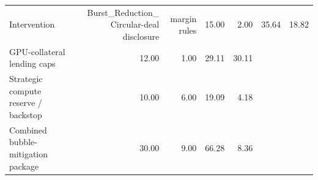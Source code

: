 \begin{tabular}{lrrrr}
\toprule
Intervention & Burst_Reduction_%
\midrule
Circular-deal disclosure & margin rules & 15.00 & 2.00 & 35.64 & 18.82 \\
GPU-collateral lending caps & 12.00 & 1.00 & 29.11 & 30.11 \\
Strategic compute reserve / backstop & 10.00 & 6.00 & 19.09 & 4.18 \\
Combined bubble-mitigation package & 30.00 & 9.00 & 66.28 & 8.36 \\
\bottomrule
\end{tabular}
